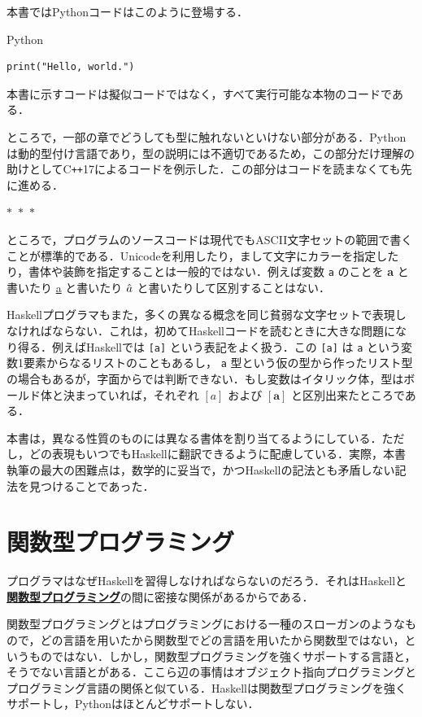 \documentclass[a5paper,twoside,fleqn,draft]{jsbook}
\newcommand{\separator}{\begin{center}$*$~$*$~$*$\end{center}}
\newcommand{\programminglanguage}[1]{\textsf{#1}}
\newcommand{\cxx}{\programminglanguage{C}\texttt{++}}
\newcommand{\cxxseventeen}{\cxx\programminglanguage{17}}
\newcommand{\haskell}{\programminglanguage{Haskell}}
\newcommand{\python}{\programminglanguage{Python}}
\newcommand{\keyword}[1]{{\underline{\textbf{#1}}}}
\newcommand{\code}[1]{\texttt{#1}}
\newenvironment{pythoncode}{\begin{itembox}[r]{\python}}{\end{itembox}}
\newcommand{\mType}[1]{\mathbf{#1}} %
\newcommand{\mA}{\mType{a}}
\begin{document}
本書では\python コードはこのように登場する．
\begin{pythoncode}
\begin{verbatim}
print("Hello, world.")
\end{verbatim}
\end{pythoncode}
本書に示すコードは擬似コードではなく，すべて実行可能な本物のコードである．

ところで，一部の章でどうしても型に触れないといけない部分がある．\python は動的型付け言語であり，型の説明には不適切であるため，この部分だけ理解の助けとして\cxxseventeen によるコードを例示した．この部分はコードを読まなくても先に進める．

\separator

ところで，プログラムのソースコードは現代でもASCII文字セットの範囲で書くことが標準的である．Unicodeを利用したり，まして文字にカラーを指定したり，書体や装飾を指定することは一般的ではない．例えば変数 \code{a} のことを \textbf{a} と書いたり \underline{a} と書いたり $\Hat a$ と書いたりして区別することはない．

\haskell プログラマもまた，多くの異なる概念を同じ貧弱な文字セットで表現しなければならない．これは，初めて\haskell コードを読むときに大きな問題になり得る．例えば\haskell では \code{[a]} という表記をよく扱う．この \code{[a]} は \code{a} という変数1要素からなるリストのこともあるし， \code{a} 型という仮の型から作ったリスト型の場合もあるが，字面からでは判断できない．もし変数はイタリック体，型はボールド体と決まっていれば，それぞれ $[a]$ および $[\mA]$ と区別出来たところである．

本書は，異なる性質のものには異なる書体を割り当てるようにしている．ただし，どの表現もいつでも\haskell に翻訳できるように配慮している．実際，本書執筆の最大の困難点は，数学的に妥当で，かつ\haskell の記法とも矛盾しない記法を見つけることであった．

\section{関数型プログラミング}

プログラマはなぜ\haskell を習得しなければならないのだろう．それは\haskell と\keyword{関数型プログラミング}の間に密接な関係があるからである．

関数型プログラミングとはプログラミングにおける一種のスローガンのようなもので，どの言語を用いたから関数型でどの言語を用いたから関数型ではない，というものではない．しかし，関数型プログラミングを強くサポートする言語と，そうでない言語とがある．ここら辺の事情はオブジェクト指向プログラミングとプログラミング言語の関係と似ている．\haskell は関数型プログラミングを強くサポートし，\python はほとんどサポートしない．
\end{document}
